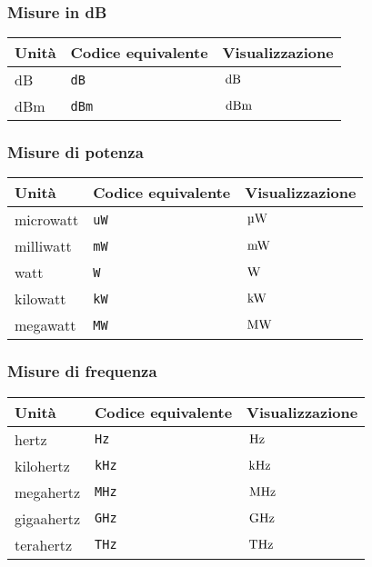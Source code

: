 \documentclass[11pt,a4paper,openany]{book}
\newcommand*{\cs}[1]{\texttt{\char92#1}}
\begin{document}
\subsubsection{Misure in dB}
\begin{center}
\begin{tabular}{lll}
\toprule
Unità & Codice equivalente & Visualizzazione\\
\midrule
dB & \cs{dB} & $\,\mathrm{dB}$ \\
dBm & \cs{dBm} & $\,\mathrm{dBm}$\\
\bottomrule
\end{tabular}
\end{center}

\subsubsection{Misure di potenza}
\begin{center}
\begin{tabular}{lll}
\toprule
Unità & Codice equivalente & Visualizzazione\\
\midrule
microwatt & \cs{uW} & $\uW$\\
milliwatt & \cs{mW} & $\,\mathrm{mW}$ \\
watt & \cs{W} & $\,\mathrm{W}$\\
kilowatt & \cs{kW} & $\,\mathrm{kW}$\\
megawatt & \cs{MW} & $\,\mathrm{MW}$\\
\bottomrule
\end{tabular}
\end{center}

\subsubsection{Misure di frequenza}
\begin{center}
\begin{tabular}{lll}
\toprule
Unità & Codice equivalente & Visualizzazione\\
\midrule
hertz & \cs{Hz} & $\,\mathrm{Hz}$\\
kilohertz & \cs{kHz} & $\,\mathrm{kHz}$ \\
megahertz & \cs{MHz} & $\,\mathrm{MHz}$\\
gigaahertz& \cs{GHz} & $\,\mathrm{GHz}$\\
terahertz & \cs{THz} & $\,\mathrm{THz}$\\
\bottomrule
\end{tabular}
\end{center}
\end{document}
